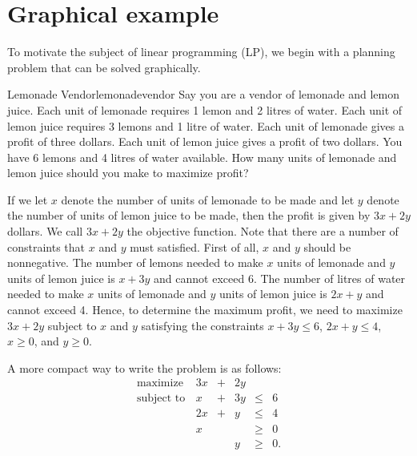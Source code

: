 %

\section{Graphical example}\label{graphic}

To motivate the subject of linear programming (LP), we begin with a
planning problem that can be solved graphically.

\begin{example}{Lemonade Vendor}{lemonadevendor}
Say you are a vendor of lemonade and lemon juice. Each unit of lemonade
requires 1 lemon and 2 litres of water. Each unit of lemon juice
requires 3 lemons and 1 litre of water. Each unit of lemonade gives a
profit of three dollars. Each unit of lemon juice gives a profit of two
dollars. You have 6 lemons and 4 litres of water available. How many
units of lemonade and lemon juice should you make to maximize profit?


If we let \(x\) denote the number of units of lemonade to be made and
let \(y\) denote the number of units of lemon juice to be made, then the
profit is given by \(3x + 2y\) dollars. We call \(3x + 2y\) the
objective function. Note that there are a number of constraints that
\(x\) and \(y\) must satisfied. First of all, \(x\) and \(y\) should be
nonnegative. The number of lemons needed to make \(x\) units of lemonade
and \(y\) units of lemon juice is \(x+3y\) and cannot exceed 6. The
number of litres of water needed to make \(x\) units of lemonade and
\(y\) units of lemon juice is \(2x+y\) and cannot exceed 4. Hence, to
determine the maximum profit, we need to maximize \(3x + 2y\) subject to
\(x\) and \(y\) satisfying the constraints \(x + 3y \leq 6\),
\(2x + y \leq 4\), \(x \geq 0\), and \(y \geq 0.\)


A more compact way to write the problem is as follows:
\[\begin{array}{rrcrll}
\mbox{maximize } & 3x & + & 2y & \\
\mbox{subject to} 
& x & + & 3y & \leq & 6 \\
& 2x & +&  y & \leq & 4 \\
& x &  & & \geq & 0 \\
& & & y & \geq & 0. \\
\end{array}\]

\end{example}
